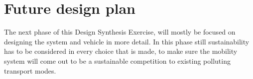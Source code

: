 \section{Future design plan}
The next phase of this Design Synthesis Exercise, will mostly be focused on designing the system and vehicle in more detail. In this phase still sustainability has to be considered in every choice that is made, to make sure the mobility system will come out to be a sustainable competition to existing polluting transport modes.  


